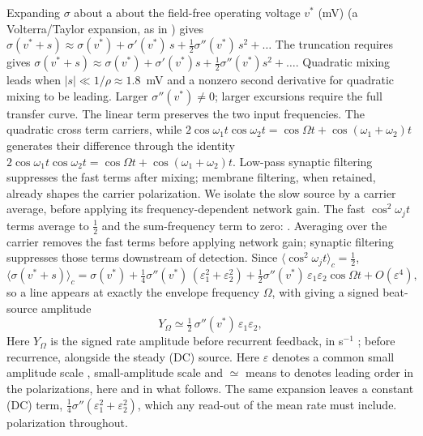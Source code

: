 \documentclass[11pt,a4paper]{article}
\newcommand{\Sig}{\sigma}
\newcommand{\half}{\tfrac{1}{2}}
\providecommand{\DIFaddtex}[1]{{\protect\color{blue} \sf #1}} %
\providecommand{\DIFdeltex}[1]{{\protect\color{red} \scriptsize #1}} %
\providecommand{\DIFaddbegin}{} %
\providecommand{\DIFaddend}{} %
\providecommand{\DIFdelbegin}{} %
\providecommand{\DIFdelend}{} %
\providecommand{\DIFadd}[1]{\texorpdfstring{\DIFaddtex{#1}}{#1}} %
\providecommand{\DIFdel}[1]{\texorpdfstring{\DIFdeltex{#1}}{}} %
\begin{document}
Expanding \DIFdelbegin \DIFdel{$\Sig$ about a }\DIFdelend \DIFaddbegin \DIFadd{about the }\DIFaddend field-free \DIFdelbegin \DIFdel{operating }\DIFdelend voltage $v^*$ (mV)
\DIFdelbegin \DIFdel{(a Volterra/Taylor expansion, as
in \cite{ruffini2025ham} ) gives
$\Sig(v^*+s)\approx\Sig(v^*)+\Sig'(v^*)\,s+\half\Sig''(v^*)\,s^2+\dots$
The truncation requires }\DIFdelend \DIFaddbegin \DIFadd{\cite{ruffini2025ham} gives
$\Sig(v^*+s)\approx\Sig(v^*)+\Sig'(v^*)s+\half\Sig''(v^*)s^2+\dots$.
Quadratic mixing leads when }\DIFaddend $|s|\ll1/\rho\approx1.8$~mV and
\DIFdelbegin \DIFdel{a nonzero second derivative
for quadratic mixing to be leading. Larger }\DIFdelend \DIFaddbegin \DIFadd{$\Sig''(v^*)\ne0$; larger }\DIFaddend excursions require the full \DIFdelbegin \DIFdel{transfer }\DIFdelend curve.
The linear term preserves the \DIFdelbegin \DIFdel{two input frequencies. The quadratic cross term
}\DIFdelend \DIFaddbegin \DIFadd{carriers, while
$2\cos\omega_1t\cos\omega_2t=\cos\Omega t+\cos(\omega_1+\omega_2)t$
}\DIFaddend generates their difference\DIFdelbegin \DIFdel{through the identity
$2\cos\omega_1t\cos\omega_2t=\cos\Omega t+\cos(\omega_1+\omega_2)t$. Low-pass synaptic filtering suppresses the fast terms after mixing; membrane
filtering, when retained, already shapes the carrier polarization. We isolate
the slow source by a carrier average, before applying its frequency-dependent
network gain. The fast
$\cos^2\omega_jt$ terms
average to $\half$ and the sum-frequency term to zero:
}\DIFdelend \DIFaddbegin \DIFadd{. Averaging over the carrier removes the fast terms
before applying network gain; synaptic filtering suppresses those terms
downstream of detection. Since $\langle\cos^2\omega_jt\rangle_c=\half$,
}\DIFaddend \begin{equation}
\big\langle\Sig(v^*+s)\big\rangle_c
=\Sig(v^*)+\tfrac14\Sig''(v^*)\,(\varepsilon_1^2+\varepsilon_2^2)
+\tfrac12\Sig''(v^*)\,\varepsilon_1\varepsilon_2\cos\Omega t+O(\varepsilon^4),
\label{eq:taylor}
\end{equation}
\DIFdelbegin \DIFdel{so a line appears at exactly the envelope frequency $\Omega$, with }\DIFdelend \DIFaddbegin \DIFadd{giving a signed beat-source }\DIFaddend amplitude
\begin{equation}
Y_\Omega\simeq\half\,\Sig''(v^*)\,\varepsilon_1\varepsilon_2 ,
\label{eq:demod}
\end{equation}
\DIFdelbegin \DIFdel{Here $Y_\Omega$ is the signed rate amplitude before recurrent feedback, }\DIFdelend in s$^{-1}$ \DIFdelbegin \DIFdel{;
}\DIFdelend \DIFaddbegin \DIFadd{before recurrence, alongside the steady (DC) source.
Here }\DIFaddend $\varepsilon$ denotes a common \DIFdelbegin \DIFdel{small amplitude scale , }\DIFdelend \DIFaddbegin \DIFadd{small-amplitude scale }\DIFaddend and $\simeq$
\DIFdelbegin \DIFdel{means to }\DIFdelend \DIFaddbegin \DIFadd{denotes }\DIFaddend leading order in \DIFdelbegin \DIFdel{the polarizations, here and in what follows.
The
same expansion leaves a constant (DC) term, $\tfrac14\Sig''(\varepsilon_1^2+\varepsilon_2^2)$,
which any read-out of the mean rate must include.
}\DIFdelend \DIFaddbegin \DIFadd{polarization throughout.
}\DIFaddend
\end{document}
